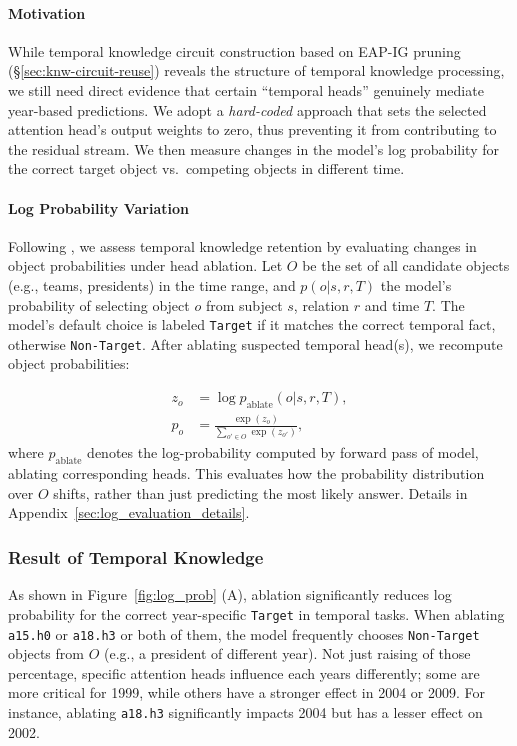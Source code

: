 \paragraph{Motivation}
While temporal knowledge circuit construction based on EAP-IG pruning (\S\ref{sec:knw-circuit-reuse}) reveals the structure of temporal knowledge processing, we still need direct evidence that certain “temporal heads” genuinely mediate year-based predictions. 
We adopt a \emph{hard-coded} approach that sets the selected attention head’s output weights to zero, thus preventing it from contributing to the residual stream. 
We then measure changes in the model’s log probability for the correct target object vs.\ competing objects in different time.
\paragraph{Log Probability Variation}
Following \citealt{logprob}, we assess temporal knowledge retention by evaluating changes in object probabilities under head ablation.  
Let \({O}\) be the set of all candidate objects (e.g., teams, presidents) in the time range, and \( p(o | s, r, T) \) the model’s probability of selecting object \( o \) from subject $s$, relation $r$ and time $T$.
The model’s default choice is labeled \texttt{Target} if it matches the correct temporal fact, otherwise \texttt{Non-Target}.  
After ablating suspected temporal head(s), we recompute object probabilities:

\begin{align}
    z_o &= \log p_\text{ablate}(o|s,r,T),
    \\ \hat{p}_o &= \frac{\exp(z_o)}{\sum_{o' \in O} \exp(z_{o'})},
\end{align}
where \( p_{\text{ablate}} \) denotes the log-probability computed by forward pass of model, ablating corresponding heads. %
This evaluates how the probability distribution over \( O \) shifts, rather than just predicting the most likely answer.
Details in Appendix~\ref{sec:log_evaluation_details}.

\subsubsection{Result of Temporal Knowledge}
As shown in Figure~\ref{fig:log_prob} (A), ablation significantly reduces log probability for the correct year-specific \texttt{Target} in temporal tasks.
When ablating \verb|a15.h0| or \verb|a18.h3| or both of them, the model frequently chooses \texttt{Non-Target} objects from \({O}\) (e.g., a president of different year). 
Not just raising of those percentage, specific attention heads influence each years differently; some are more critical for 1999, while others have a stronger effect in 2004 or 2009.
For instance, ablating \verb|a18.h3| significantly impacts 2004 but has a lesser effect on 2002.  

